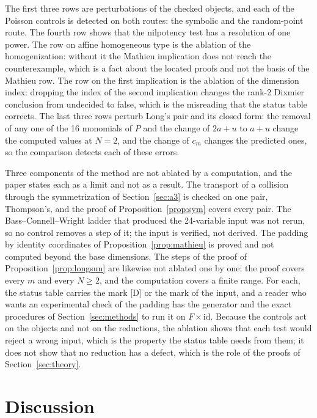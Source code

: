 \documentclass[11pt]{article}
\theoremstyle{remark}
\begin{document}
The first three rows are perturbations of the checked objects, and each of the Poisson controls is detected on both routes: the symbolic and the random-point route. The fourth row shows that the nilpotency test has a resolution of one power. The row on affine homogeneous type is the ablation of the homogenization: without it the Mathieu implication does not reach the counterexample, which is a fact about the located proofs and not the basis of the Mathieu row. The row on the first implication is the ablation of the dimension index: dropping the index of the second implication changes the rank-2 Dixmier conclusion from undecided to false, which is the misreading that the status table corrects. The last three rows perturb Long's pair and its closed form: the removal of any one of the 16 monomials of $P$ and the change of $2a+u$ to $a+u$ change the computed values at $N=2$, and the change of $c_m$ changes the predicted ones, so the comparison detects each of these errors.

Three components of the method are not ablated by a computation, and the paper states each as a limit and not as a result. The transport of a collision through the symmetrization of Section~\ref{sec:a3} is checked on one pair, Thompson's, and the proof of Proposition~\ref{prop:sym} covers every pair. The Bass--Connell--Wright ladder that produced the 24-variable input was not rerun, so no control removes a step of it; the input is verified, not derived. The padding by identity coordinates of Proposition~\ref{prop:mathieu} is proved and not computed beyond the base dimensions. The steps of the proof of Proposition~\ref{prop:longsun} are likewise not ablated one by one: the proof covers every $m$ and every $N\ge2$, and the computation covers a finite range. For each, the status table carries the mark [D] or the mark of the input, and a reader who wants an experimental check of the padding has the generator and the exact procedures of Section~\ref{sec:methods} to run it on $F\times\mathrm{id}$. Because the controls act on the objects and not on the reductions, the ablation shows that each test would reject a wrong input, which is the property the status table needs from them; it does not show that no reduction has a defect, which is the role of the proofs of Section~\ref{sec:theory}.

\section{Discussion}\label{sec:discussion}
\end{document}
